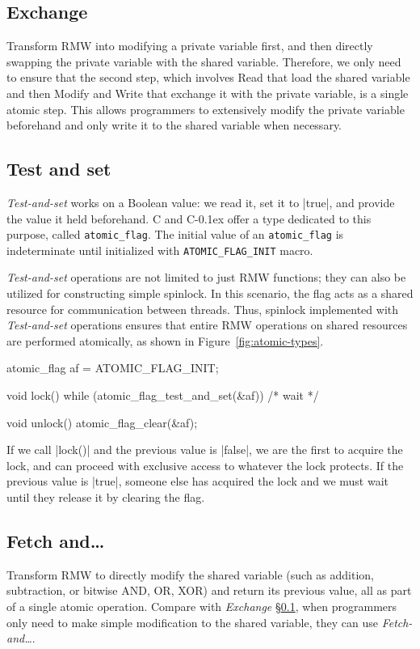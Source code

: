 \documentclass[fontsize=10pt, oneside]{scrartcl}
\newcommand{\monobox}[1]{\mbox{\texttt{#1}}}
\newcommand{\cplusplus}[1]{C\kern-0.1ex\raisebox{0.15ex}{\texttt{++}}#1}
\newcommand{\clang}[1]{C#1}
\newcommand{\fig}[1]{Figure~\ref{#1}}
\newcommand{\introduce}[1]{\textit{#1}}
\newcommand{\secref}[1]{\hyperref[#1]{\textsc{\S}\ref*{#1}}}
\begin{document}
\subsection{Exchange}
\label{exchange}
Transform \textsc{RMW} into modifying a private variable first, 
and then directly swapping the private variable with the shared variable. 
Therefore, we only need to ensure that the second step, 
which involves Read that load the shared variable and then Modify and Write that exchange it with the private variable, 
is a single atomic step.
This allows programmers to extensively modify the private variable beforehand and only write it to the shared variable when necessary. 

\subsection{Test and set}
\label{Testandset}
\introduce{Test-and-set} works on a Boolean value:
we read it, set it to \cpp|true|, and provide the value it held beforehand.
\clang{} and \cplusplus{} offer a type dedicated to this purpose, called \monobox{atomic\_flag}.
The initial value of an \monobox{atomic\_flag} is indeterminate until initialized with \monobox{ATOMIC\_FLAG\_INIT} macro.

\introduce{Test-and-set} operations are not limited to just \textsc{RMW} functions; 
they can also be utilized for constructing simple spinlock. 
In this scenario, the flag acts as a shared resource for communication between threads. 
Thus, spinlock implemented with \introduce{Test-and-set} operations ensures that entire \textsc{RMW} operations on shared resources are performed atomically, as shown in \fig{fig:atomic-types}.
\label{spinlock}
\begin{ccode}
atomic_flag af = ATOMIC_FLAG_INIT;

void lock()
{
    while (atomic_flag_test_and_set(&af)) { /* wait */ }
}

void unlock() { atomic_flag_clear(&af); }
\end{ccode}
If we call \cc|lock()| and the previous value is \cc|false|,
we are the first to acquire the lock,
and can proceed with exclusive access to whatever the lock protects.
If the previous value is \cc|true|,
someone else has acquired the lock and we must wait until they release it by clearing the flag.

\subsection{Fetch and…}
Transform \textsc{RMW} to directly modify the shared variable (such as addition, subtraction,
or bitwise \textsc{AND}, \textsc{OR}, \textsc{XOR}) and return its previous value, 
all as part of a single atomic operation. 
Compare with \introduce{Exchange} \secref{exchange}, when programmers only need to make simple modification to the shared variable, 
they can use \introduce{Fetch-and…}.
\end{document}
